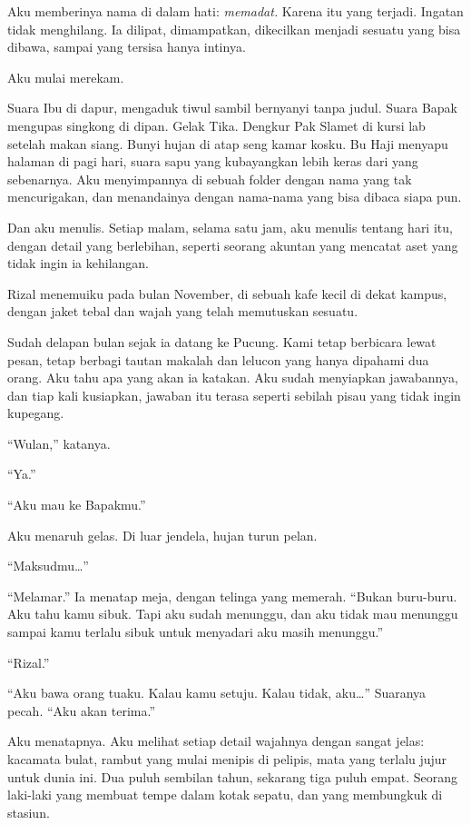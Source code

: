 \documentclass[11pt,twoside,openany]{book}
\makeatletter
\newcommand{\scenebreak}{\par\vspace{0.9em}{\centering\textsc{*\hspace{0.7em}*\hspace{0.7em}*}\par}\vspace{0.9em}\@afterindentfalse\@afterheading}
\makeatother
\begin{document}
Aku memberinya nama di dalam hati: \emph{memadat.} Karena itu yang terjadi. Ingatan tidak menghilang. Ia dilipat, dimampatkan, dikecilkan menjadi sesuatu yang bisa dibawa, sampai yang tersisa hanya intinya.

Aku mulai merekam.

Suara Ibu di dapur, mengaduk tiwul sambil bernyanyi tanpa judul. Suara Bapak mengupas singkong di dipan. Gelak Tika. Dengkur Pak Slamet di kursi lab setelah makan siang. Bunyi hujan di atap seng kamar kosku. Bu Haji menyapu halaman di pagi hari, suara sapu yang kubayangkan lebih keras dari yang sebenarnya. Aku menyimpannya di sebuah folder dengan nama yang tak mencurigakan, dan menandainya dengan nama-nama yang bisa dibaca siapa pun.

Dan aku menulis. Setiap malam, selama satu jam, aku menulis tentang hari itu, dengan detail yang berlebihan, seperti seorang akuntan yang mencatat aset yang tidak ingin ia kehilangan.

\scenebreak
Rizal menemuiku pada bulan November, di sebuah kafe kecil di dekat kampus, dengan jaket tebal dan wajah yang telah memutuskan sesuatu.

Sudah delapan bulan sejak ia datang ke Pucung. Kami tetap berbicara lewat pesan, tetap berbagi tautan makalah dan lelucon yang hanya dipahami dua orang. Aku tahu apa yang akan ia katakan. Aku sudah menyiapkan jawabannya, dan tiap kali kusiapkan, jawaban itu terasa seperti sebilah pisau yang tidak ingin kupegang.

``Wulan,'' katanya.

``Ya.''

``Aku mau ke Bapakmu.''

Aku menaruh gelas. Di luar jendela, hujan turun pelan.

``Maksudmu\ldots{}''

``Melamar.'' Ia menatap meja, dengan telinga yang memerah. ``Bukan buru-buru. Aku tahu kamu sibuk. Tapi aku sudah menunggu, dan aku tidak mau menunggu sampai kamu terlalu sibuk untuk menyadari aku masih menunggu.''

``Rizal.''

``Aku bawa orang tuaku. Kalau kamu setuju. Kalau tidak, aku\ldots{}'' Suaranya pecah. ``Aku akan terima.''

Aku menatapnya. Aku melihat setiap detail wajahnya dengan sangat jelas: kacamata bulat, rambut yang mulai menipis di pelipis, mata yang terlalu jujur untuk dunia ini. Dua puluh sembilan tahun, sekarang tiga puluh empat. Seorang laki-laki yang membuat tempe dalam kotak sepatu, dan yang membungkuk di stasiun.
\end{document}
